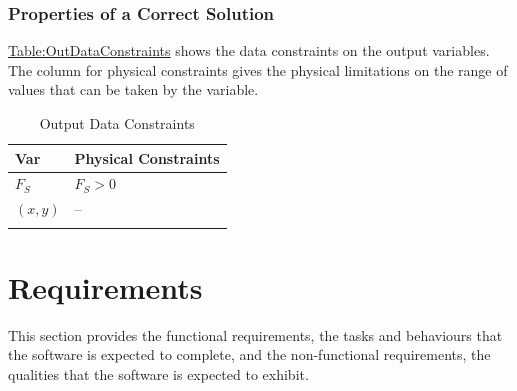 \documentclass[12pt]{article}
\begin{document}
\subsubsection{Properties of a Correct Solution}
\label{Sec:CorSolProps}
\hyperref[Table:OutDataConstraints]{Table:OutDataConstraints} shows the data constraints on the output variables. The column for physical constraints gives the physical limitations on the range of values that can be taken by the variable.
\begin{longtable}{l l}
\toprule
\textbf{Var} & \textbf{Physical Constraints}
\\
\midrule
\endhead
${F_{S}}$ & ${F_{S}}>0$
\\
$(x,y)$ & --
\\
\bottomrule
\caption{Output Data Constraints}
\label{Table:OutDataConstraints}
\end{longtable}
\section{Requirements}
\label{Sec:Requirements}
This section provides the functional requirements, the tasks and behaviours that the software is expected to complete, and the non-functional requirements, the qualities that the software is expected to exhibit.
\end{document}
